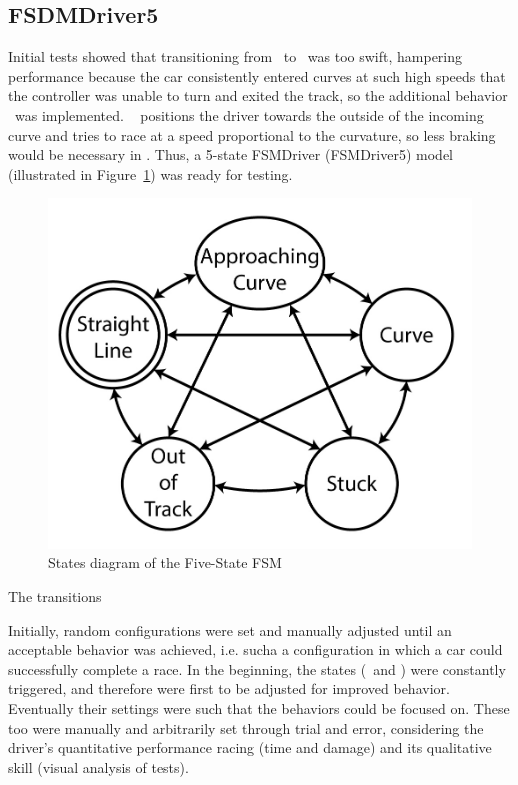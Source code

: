 \subsection{FSDMDriver5}

Initial tests showed that transitioning from \SL~to \C~was too swift, hampering performance because the car consistently entered curves at such high speeds that the controller was unable to turn and exited the track, so the additional behavior \AC~was implemented. \AC~ positions the driver towards the outside of the incoming curve and tries to race at a speed proportional to the curvature, so less braking would be necessary in \C. Thus, a 5-state FSMDriver (FSMDriver5) model (illustrated in Figure~\ref{Fig:FSM5Diagram}) was ready for testing.

\begin{figure}[h]
	\centering
	\includegraphics[width=.45\textwidth]{FiveStateFSM}
	\caption{States diagram of the Five-State FSM}
	\label{Fig:FSM5Diagram}
\end{figure}


The transitions %

Initially, random configurations were set and manually adjusted until an acceptable behavior was achieved, i.e. sucha a configuration in which a car could successfully complete a race. In the beginning, the  states (\OT~and \St) were constantly triggered, and therefore were first to be adjusted for improved behavior. Eventually their settings were such that the  behaviors could be focused on. These too were manually and arbitrarily set through trial and error, considering the driver's quantitative performance racing (time and damage) and its qualitative skill (visual analysis of tests).

